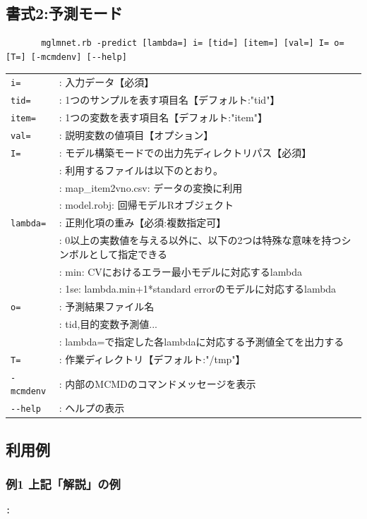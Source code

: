 \subsection{書式2:予測モード}

\begin{verbatim}
       mglmnet.rb -predict [lambda=] i= [tid=] [item=] [val=] I= o= [T=] [-mcmdenv] [--help]
\end{verbatim}

\begin{table}[htbp]
{\small
\begin{tabular}{ll}
\verb|i=|      & : 入力データ【必須】 \\
\verb|tid=|    & : 1つのサンプルを表す項目名【デフォルト:"tid"】 \\
\verb|item=|   & : 1つの変数を表す項目名【デフォルト:"item"】 \\
\verb|val=|    & : 説明変数の値項目【オプション】 \\
\verb|I=|      & : モデル構築モードでの出力先ディレクトリパス【必須】 \\
               & : 利用するファイルは以下のとおり。 \\
               & :   map\_item2vno.csv: データの変換に利用 \\
               & :   model.robj: 回帰モデルRオブジェクト  \\
\verb|lambda=| & : 正則化項の重み【必須:複数指定可】 \\
               & :   0以上の実数値を与える以外に、以下の2つは特殊な意味を持つシンボルとして指定できる \\
               & :   min: CVにおけるエラー最小モデルに対応するlambda \\
               & :   1se: lambda.min+1*standard errorのモデルに対応するlambda \\
\verb|o=|      & : 予測結果ファイル名 \\
               & :   tid,目的変数予測値... \\
               & : lambda=で指定した各lambdaに対応する予測値全てを出力する \\
\verb|T=|      & : 作業ディレクトリ【デフォルト:"/tmp"】 \\
\verb|-mcmdenv|& : 内部のMCMDのコマンドメッセージを表示 \\
\verb|--help|  & : ヘルプの表示

\end{tabular} 
}
\end{table} 


\subsection{利用例}
\subsubsection{例1 上記「解説」の例}
\begin{Verbatim}[baselinestretch=0.7,frame=single]
:
\end{Verbatim}


%

